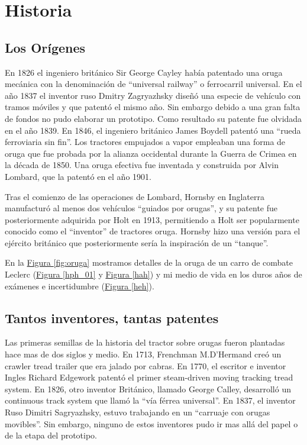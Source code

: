 \section{Historia}

\subsection*{Los Orígenes}


En 1826 el ingeniero británico Sir George Cayley había patentado una
oruga mecánica con la denominación de ``universal railway'' o
ferrocarril universal. En el año 1837 el inventor ruso Dmitry
Zagryazhsky diseñó una especie de vehículo con tramos móviles y que
patentó el mismo año. Sin embargo debido a una gran falta de fondos no
pudo elaborar un prototipo. Como resultado su patente fue olvidada en
el año 1839. En 1846, el ingeniero británico James Boydell patentó una
``rueda ferroviaria sin fin''. Los tractores empujados a vapor
empleaban una forma de oruga que fue probada por la alianza occidental
durante la Guerra de Crimea en la década de 1850. Una oruga efectiva
fue inventada y construida por Alvin Lombard, que la patentó en el año
1901.



Tras el comienzo de las operaciones de Lombard, Hornsby en Inglaterra
manufacturó al menos dos vehículos ``guiados por orugas'', y su
patente fue posteriormente adquirida por Holt en 1913, permitiendo a
Holt ser popularmente conocido como el ``inventor'' de tractores
oruga. Hornsby hizo una versión para el ejército británico que
posteriormente sería la inspiración de un ``tanque''.



En la \hyperref[fig:oruga]{Figura \ref*{fig:oruga}} mostramos detalles
de la oruga de un carro de combate Leclerc (\hyperref[hph_01]{Figura
  \ref*{hph_01}} y \hyperref[hah]{Figura \ref*{hah}}) y mi medio de
vida en los duros años de exámenes e incertidumbre
(\hyperref[heh]{Figura \ref*{heh}}).

\subsection*{Tantos inventores, tantas patentes}

Las primeras semillas de la historia del tractor sobre orugas fueron
plantadas hace mas de dos siglos y medio. En 1713, Frenchman
M.D’Hermand creó un crawler tread trailer que era jalado por
cabras. En 1770, el escritor e inventor Ingles Richard Edgework
patentó el primer steam-driven moving tracking tread system. En 1826,
otro inventor Británico, llamado George Calley, desarrolló un
continuous track system que llamó la ``vía férrea universal''. En
1837, el inventor Ruso Dimitri Sagryazhsky, estuvo trabajando en un
``carruaje con orugas movibles''. Sin embargo, ninguno de estos
inventores pudo ir mas allá del papel o de la etapa del prototipo.

